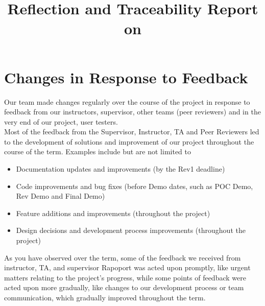 \documentclass{article}
\title{Reflection and Traceability Report on \progname}
\author{\authname}
\date{}
\begin{document}
\maketitle

\section{Changes in Response to Feedback}


Our team made changes regularly over the course of the project in 
response to feedback from our instructors, supervisor, other teams
(peer reviewers) and in the very end of our project, user testers.\\

Most of the feedback from the Supervisor, Instructor, TA and Peer Reviewers 
led to the development of solutions and improvement of our project throughout
the course of the term. Examples include but are not limited to
\begin{itemize}
  \item Documentation updates and improvements (by the Rev1 deadline)
  \item Code improvements and bug fixes (before Demo dates, such as POC Demo, Rev Demo and Final Demo)
  \item Feature additions and improvements (throughout the project)
  \item Design decisions and development process improvements (throughout the project)
\end{itemize}
As you have observed over the term, some of the feedback we received from 
instructor, TA, and supervisor Rapoport was acted upon promptly, like urgent
matters relating to the project's progress, while some points of feedback
were acted upon more gradually, like changes to our development process
or team communication, which gradually improved throughout the term.\\
\end{document}
